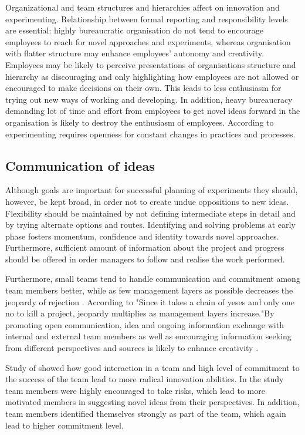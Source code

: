 Organizational and team structures and hierarchies affect on innovation and experimenting. Relationship between formal reporting and responsibility levels are essential: highly bureaucratic organisation do not tend to encourage employees to reach for novel approaches and experiments, whereas organisation with flatter structure may enhance employees' autonomy and creativity. Employees may be likely to perceive presentations of organisations structure and hierarchy as discouraging and only highlighting how employees are not allowed or encouraged to make decisions on their own. This leads to less enthusiasm for trying out new ways of working and developing. In addition, heavy bureaucracy demanding lot of time and effort from employees to get novel ideas forward in the organisation is likely to destroy the enthusiasm of employees. \citep{shalley2004leaders} According to \citet{thomke2003r} experimenting requires openness for constant changes in practices and processes.

\subsection{Communication of ideas}
Although goals are important for successful planning of experiments they should, however, be kept broad, in order not to create undue oppositions to new ideas. Flexibility should be maintained by not defining intermediate steps in detail and by trying alternate options and routes. Identifying and solving problems at early phase fosters momentum, confidence and identity towards novel approaches. Furthermore, sufficient amount of information about the project and progress should be offered in order managers to follow and realise the work performed. \citep{quinn1985managing}

Furthermore, small teams tend to handle communication and commitment among team members better, while as few management layers as possible decreases the jeopardy of rejection \citep{quinn1985managing}. According to \citet{quinn1985managing} "Since it takes a chain of yeses and only one no to kill a project, jeopardy multiplies as management layers increase."By promoting open communication, idea and ongoing information exchange with internal and external team members as well as encouraging information seeking from different perspectives and sources is likely to enhance creativity \citep{ancona1992demography,dougherty1996sustained}. 

Study of \citet{sethi2001cross} showed how good interaction in a team and high level of commitment to the success of the team lead to more radical innovation abilities. In the study team members were highly encouraged to take risks, which lead to more motivated members in suggesting novel ideas from their perspectives. In addition, team members identified themselves strongly as part of the team, which again lead to higher commitment level. \citep{sethi2001cross}

